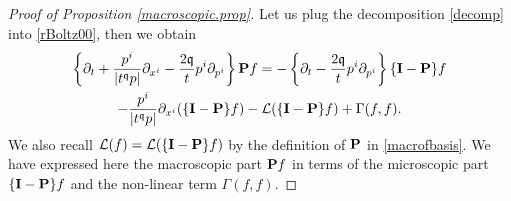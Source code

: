 \documentclass[reqno]{amsart}
\newcommand{\pv}{p}
\newcommand{\qq}{\mathfrak{q}}
\newcommand{\tq}{t^{\qq}}
\newcommand{\linL}{\mathcal{L}}
\newcommand{\macro}{{\bf P}}
\newcommand{\micro}{{\bf \{I- P\}}}
\theoremstyle{definition}
\numberwithin{equation}{section}
\numberwithin{theorem}{section}
\begin{document}
\begin{proof}[Proof of Proposition \ref{macroscopic.prop}]
Let us plug the decomposition \eqref{decomp} into \eqref{rBoltz00}, then we obtain 
\begin{multline}\label{hydro}
\left\{\partial_t+\frac{\pv^i}{|\tq \pv|} \partial_{x^i} -\frac{2\qq }{t} p^i \partial_{p^i} \right\}\macro f
= -\left\{\partial_t -\frac{2\qq }{t} p^i \partial_{p^i} \right\}\micro f
\\ 
-\frac{\pv^i}{|\tq \pv|} \partial_{x^i} (\micro f)  -\linL(\micro f)
+ \Gamma(f,f).
\end{multline}
We also recall $\linL(f)=\linL(\micro f)$ by the definition of \(\macro\) in \eqref{macrofbasis}. We have expressed here the macroscopic part $\macro f$ in terms of the microscopic part $\micro f$ and the non-linear term $\Gamma (f,f)$.



\end{proof}
\end{document}
